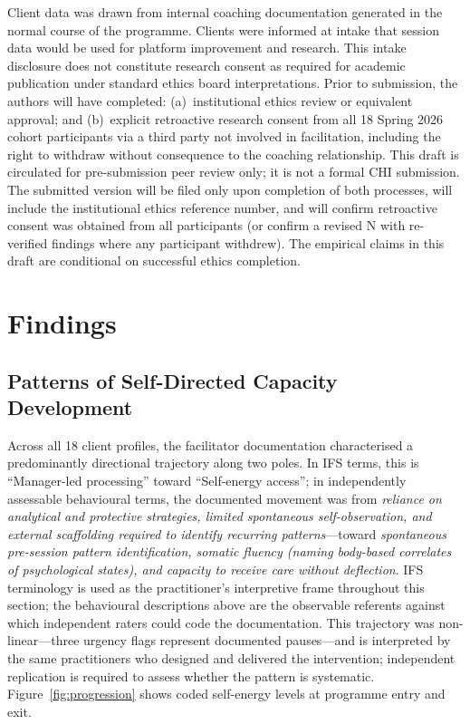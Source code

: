 \documentclass[sigchi,review,anonymous]{acmart}
\begin{document}
Client data was drawn from internal coaching documentation generated in the normal course
of the programme. Clients were informed at intake that session data would be used for
platform improvement and research. This intake disclosure does not constitute research
consent as required for academic publication under standard ethics board interpretations.
Prior to submission, the authors will have completed: (a)~institutional ethics review or
equivalent approval; and (b)~explicit retroactive research consent from all 18 Spring 2026
cohort participants via a third party not involved in facilitation, including the right to
withdraw without consequence to the coaching relationship. This draft is circulated for
pre-submission peer review only; it is not a formal CHI submission. The submitted version
will be filed only upon completion of both processes, will include the institutional ethics
reference number, and will confirm retroactive consent was obtained from all participants
(or confirm a revised N with re-verified findings where any participant withdrew). The
empirical claims in this draft are conditional on successful ethics completion.

\section{Findings}

\subsection{Patterns of Self-Directed Capacity Development}

Across all 18 client profiles, the facilitator documentation characterised a predominantly
directional trajectory along two poles. In IFS terms, this is ``Manager-led processing''
toward ``Self-energy access''; in independently assessable behavioural terms, the documented
movement was from \emph{reliance on analytical and protective strategies, limited spontaneous
self-observation, and external scaffolding required to identify recurring patterns}---toward
\emph{spontaneous pre-session pattern identification, somatic fluency (naming body-based
correlates of psychological states), and capacity to receive care without deflection}. IFS
terminology is used as the practitioner's interpretive frame throughout this section; the
behavioural descriptions above are the observable referents against which independent raters
could code the documentation. This trajectory was non-linear---three urgency flags represent
documented pauses---and is interpreted by the same practitioners who designed and delivered
the intervention; independent replication is required to assess whether the pattern is
systematic. Figure~\ref{fig:progression} shows
coded self-energy levels at programme entry and exit.
\end{document}
